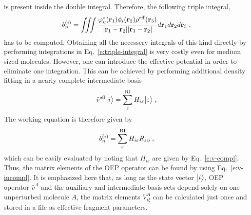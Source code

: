 is present inside the double integral. Therefore, the following triple integral,
%
\begin{equation} \label{e:triple-integral}
 b^{(i)}_\eta = \iiint 
           \frac{ \varphi^*_\eta({\bf r}_1) \phi_i({\bf r}_2)  \rho^{\rm eff}({\bf r}_3) }
            {\vert {\bf r}_1 - {\bf r}_2 \vert \vert {\bf r}_3 - {\bf r}_2 \vert}
           d{\bf r}_1 d{\bf r}_2 d{\bf r}_3 \;,
\end{equation}
%
has to be computed.
Obtaining all the necessery integrals of this kind directly 
by performing integrations in Eq.~\eqref{e:triple-integral} is very costly 
even for medium sized molecules.\cite{Barca.Loos.JCP.2017}
However, one can introduce the effective potential in order to eliminate one integration. 
This can be achieved by performing additional density fitting 
in a nearly complete intermediate basis\cite{Barca.Loos.JCP.2017}  %
%
\begin{equation}
 \hat{v}^{\rm eff} \Ket{i} = \sum_\varepsilon^{\rm RI} H_{i\varepsilon} \Ket{\varepsilon} \;,
\end{equation}
%
The working equation is therefore given by
%
\begin{equation} \label{e:v-compl-b-coeff}
 b^{(i)}_\eta = \sum_\varepsilon^{\rm RI} H_{i\varepsilon} R_{\varepsilon\eta} \;,
\end{equation}
%
which can be easily evaluated by noting that
$H_{i\varepsilon}$ are given by Eq.~\eqref{e:v-compl}.
Thus, the matrix elements of the OEP operator can be found
by using Eq.~\eqref{e:v-incompl}.
It is emphasized here that, as long as the state vector $\Ket{i}$, OEP operator $\hat{v}^A$ 
and the auxiliary and intermediate basis sets depend solely on one unperturbed molecule $A$, the matrix elements
$V^A_{i\xi}$ can be calculated just once and stored in a file as effective fragment parameters.

